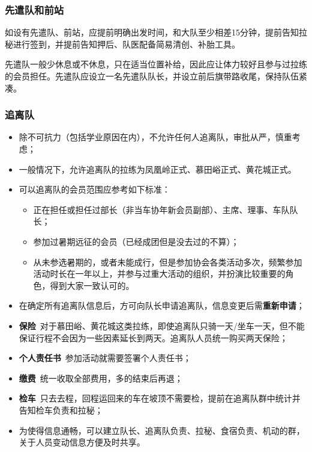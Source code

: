 \documentclass[UTF8]{ctexart}
\begin{document}
\subsubsection{先遣队和前站}

如设有先遣队、前站，应提前明确出发时间，和大队至少相差15分钟，提前告知拉秘进行签到，并提前告知押后、队医配备简易清创、补胎工具。

先遣队一般少休息或不休息，只在适当位置补给，因此应让体力较好且参与过拉练的会员担任。先遣队应设立一名先遣队队长，并设立前后旗带路收尾，保持队伍紧凑。

\subsubsection{追离队}

\begin{itemize}[nosep,left=2em]
    \item 除不可抗力（包括学业原因在内），不允许任何人追离队，审批从严，慎重考虑；
    \item 一般情况下，允许追离队的拉练为凤凰岭正式、慕田峪正式、黄花城正式。
    \item 可以追离队的会员范围应参考如下标准：
    \begin{itemize}[nosep]
        \item 正在担任或担任过部长（非当车协年新会员副部）、主席、理事、车队队长；
        \item 参加过暑期远征的会员（已经成团但是没去过的不算）；
        \item 从未参选暑期的，或者未能成行，但是参加协会各类活动多次，频繁参加活动时长在一年以上，并参与过重大活动的组织，并扮演比较重要的角色，得到大家一致认可的。
    \end{itemize}
    \item 在确定所有追离队信息后，方可向队长申请追离队，信息变更后需\textbf{重新申请}；
    \item \textbf{保险}\ 对于慕田峪、黄花城这类拉练，即使追离队只骑一天/坐车一天，但不能保证行程不会因为一些因素延长到两天。追离队人员统一购买两天保险；
    \item \textbf{个人责任书}\ 参加活动就需要签署个人责任书；
    \item \textbf{缴费}\ 统一收取全部费用，多的结束后再退；
    \item \textbf{检车}\ 只去去程，回程运回来的车在坡顶不需要检，提前在追离队群中统计并告知检车负责和拉秘；
    \item 为使得信息通畅，可以建立队长、追离队负责、拉秘、食宿负责、机动的群，关于人员变动信息方便及时共享。
\end{itemize}
\end{document}
